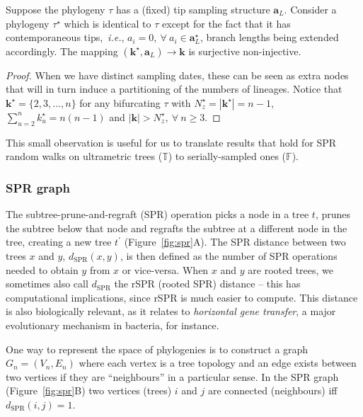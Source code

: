 \begin{remark}
\label{rmk:k_kprime}
 Suppose the phylogeny $\tau$ has a (fixed) tip sampling structure $\boldsymbol a_L$. 
 Consider a phylogeny $\tau^\star$ which is identical to $\tau$ except for the fact that it has contemporaneous tips,~\textit{i.e.}, $a_i = 0,\: \forall \: a_i \in \boldsymbol a^\star_L$, branch lengths being extended accordingly.
 The mapping $ (\boldsymbol k^\star, \boldsymbol a_L) \to \boldsymbol k$ is surjective non-injective.
\end{remark}
\begin{proof}
 When we have distinct sampling dates, these can be seen as extra nodes that will in turn induce a partitioning of the numbers of lineages.
 Notice that $\boldsymbol k^\star = \{ 2, 3, \ldots, n\}$ for any bifurcating $\tau$ with $N^\star_z = |\boldsymbol k^\star| = n - 1$, $\sum_{u = 2}^n  k_u^\star = n(n-1)$ and  $|\boldsymbol k| > N^\star_z, \: \forall \: n\geq3$.
\end{proof}
This small observation is useful for us to translate results that hold for SPR random walks on ultrametric trees ($\mathbb{T}$) to serially-sampled  ones ($\mathbb{F}$).

\subsubsection{SPR graph}
\label{sec:spr_stuff}

The subtree-prune-and-regraft (SPR) operation picks a node in a tree $t$, prunes the subtree below that node and regrafts the subtree at a different node in the tree, creating a new tree $t^\prime$ (Figure~\ref{fig:spr}A).
The SPR distance between two trees $x$ and $y$, $d_\text{SPR}(x, y)$, is then defined as the number of SPR operations needed to obtain $y$ from $x$ or vice-versa.
When $x$ and $y$ are rooted trees, we sometimes also call $d_\text{SPR}$ the rSPR (rooted SPR) distance -- this has computational implications, since rSPR is much easier to compute.
This distance is also biologically relevant, as it relates to \textit{horizontal gene transfer}, a major evolutionary mechanism in bacteria, for instance.

One way to represent the space of phylogenies is to construct a graph $G_n = (V_n, E_n)$ where each vertex is a tree topology and an edge exists between two vertices if they are ``neighbours'' in a particular sense.
In the SPR graph (Figure~\ref{fig:spr}B) two vertices (trees) $i$ and $j$ are connected (neighbours) iff  $d_\text{SPR}(i, j) = 1$.

